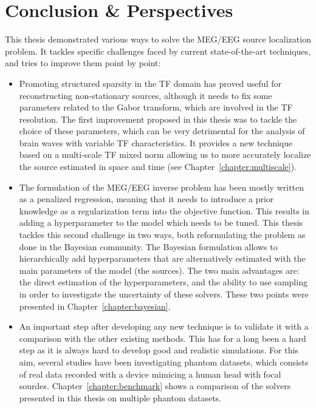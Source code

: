 
\chapter{Conclusion \& Perspectives}
\label{chapter:conclusion}

This thesis demonstrated various ways to solve the MEG/EEG source localization problem. It tackles specific challenges faced by current state-of-the-art techniques, and tries to improve them point by point:
\begin{itemize}
\item Promoting structured sparsity in the TF domain has proved useful for reconstructing non-stationary sources, although it needs to fix some parameters related to the Gabor transform, which are involved in the TF resolution. The first improvement proposed in this thesis was to tackle the choice of these parameters, which can be very detrimental for the analysis of brain waves with variable TF characteristics. It provides a new technique based on a multi-scale TF mixed norm allowing us to more accurately localize the source estimated in space and time (see Chapter~\ref{chapter:multiscale}).

\item The formulation of the MEG/EEG inverse problem has been mostly written as a penalized regression, meaning that it needs to introduce a prior knowledge as a regularization term into the objective function. This results in adding a hyperparameter to the model which needs to be tuned. This thesis tackles this second challenge in two ways, both reformulating the problem as done in the Bayesian community. The Bayesian formulation allows to hierarchically add hyperparameters that are alternatively estimated with the main parameters of the model (the sources). The two main advantages are: the direct estimation of the hyperparameters, and the ability to use sampling in order to investigate the uncertainty of these solvers. These two points were presented in Chapter~\ref{chapter:bayesian}.

\item An important step after developing any new technique is to validate it with a comparison with the other existing methods. This has for a long been a hard step as it is always hard to develop good and realistic simulations. For this aim, several studies have been investigating phantom datasets, which consists of real data recorded with a device mimicing a human head with focal sourdes. Chapter~\ref{chapter:benchmark} shows a comparison of the solvers presented in this thesis on multiple phantom datasets.
\end{itemize}

